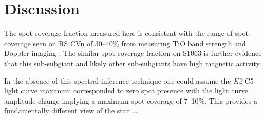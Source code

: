 \documentclass[twocolumn]{emulateapj}%
\begin{document}
\section{Discussion}





The spot coverage fraction measured here is consistent with the range of spot coverage seen on RS CVn of 30--40\% from measuring TiO band strength \citep{oneal96, oneal98, oneal04} and Doppler imaging \citep{hackman12}. The similar spot coverage fraction on S1063 is further evidence that this sub-subgiant and likely other sub-subgiants have high magnetic activity.

In the absence of this spectral inference technique one could assume the \textit{K2} C5 light curve maximum corresponded to zero spot presence with the light curve amplitude change implying a maximum spot coverage of 7--10\%. This provides a fundamentally different view of the star ...
\end{document}
